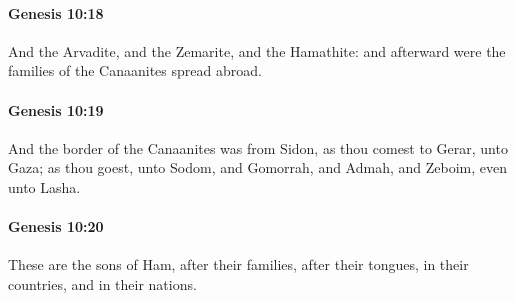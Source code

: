 		\paragraph{Genesis 10:18} %
			\label{GENESIS-10-18}

			And the Arvadite, and the Zemarite, and the Hamathite: and afterward were the families of the Canaanites spread abroad.


		\paragraph{Genesis 10:19} %
			\label{GENESIS-10-19}

			And the border of the Canaanites was from Sidon, as thou comest to Gerar, unto Gaza; as thou goest, unto Sodom, and Gomorrah, and Admah, and Zeboim, even unto Lasha.


		\paragraph{Genesis 10:20} %
			\label{GENESIS-10-20}

			These are the sons of Ham, after their families, after their tongues, in their countries, and in their nations.


